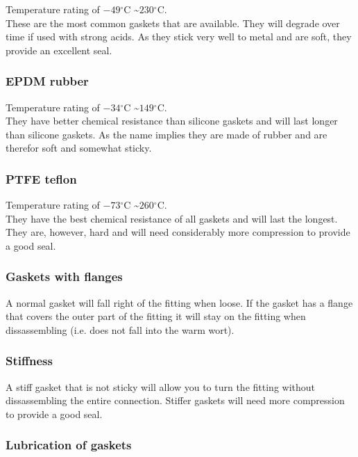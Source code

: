 \documentclass[11pt,fleqn,openany]{book} %
\newcommand{\degree}{\ensuremath{^\circ}}
\begin{document}
Temperature rating of $-49\degree$C \textasciitilde $230\degree$C.\\
These are the most common gaskets that are available. They will degrade over time if used with strong acids. As they stick very well to metal and are soft, they provide an excellent seal.

\subsubsection{EPDM rubber}

Temperature rating of $-34\degree$C \textasciitilde $149\degree$C.\\
They have better chemical resistance than silicone gaskets and will last longer than silicone gaskets. As the name implies they are made of rubber and are therefor soft and somewhat sticky.

\subsubsection{PTFE teflon}

Temperature rating of $-73\degree$C \textasciitilde $260\degree$C.\\
They have the best chemical resistance of all gaskets and will last the longest. They are, however, hard and will need considerably more compression to provide a good seal.

\subsubsection{Gaskets with flanges}

A normal gasket will fall right of the fitting when loose. If the gasket has a flange that covers the outer part of the fitting it will stay on the fitting when dissassembling (i.e. does not fall into the warm wort).

\subsubsection{Stiffness}

A stiff gasket that is not sticky will allow you to turn the fitting without dissassembling the entire connection. Stiffer gaskets will need more compression to provide a good seal.

\subsubsection{Lubrication of gaskets}
\end{document}
